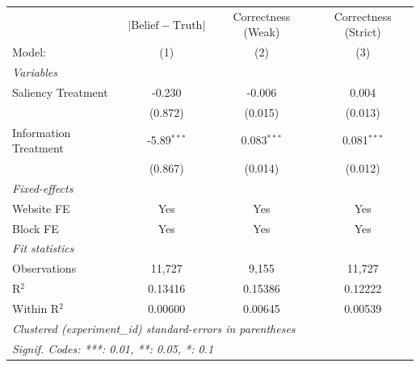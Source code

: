 \begin{tabular}{lccc}
   \tabularnewline \midrule \midrule
                         & $\lvert \text{Belief} - \text{Truth} \rvert$     & Correctness (Weak) & Correctness (Strict) \\   
   Model:                & (1)                                              & (2)                & (3)\\  
   \midrule
   \emph{Variables}\\
   Saliency Treatment    & -0.230                                           & -0.006             & 0.004\\   
                         & (0.872)                                          & (0.015)            & (0.013)\\   
   Information Treatment & -5.89$^{***}$                                    & 0.083$^{***}$      & 0.081$^{***}$\\   
                         & (0.867)                                          & (0.014)            & (0.012)\\   
   \midrule
   \emph{Fixed-effects}\\
   Website FE            & Yes                                              & Yes                & Yes\\  
   Block FE              & Yes                                              & Yes                & Yes\\  
   \midrule
   \emph{Fit statistics}\\
   Observations          & 11,727                                           & 9,155              & 11,727\\  
   R$^2$                 & 0.13416                                          & 0.15386            & 0.12222\\  
   Within R$^2$          & 0.00600                                          & 0.00645            & 0.00539\\  
   \midrule \midrule
   \multicolumn{4}{l}{\emph{Clustered (experiment\_id) standard-errors in parentheses}}\\
   \multicolumn{4}{l}{\emph{Signif. Codes: ***: 0.01, **: 0.05, *: 0.1}}\\
\end{tabular}
